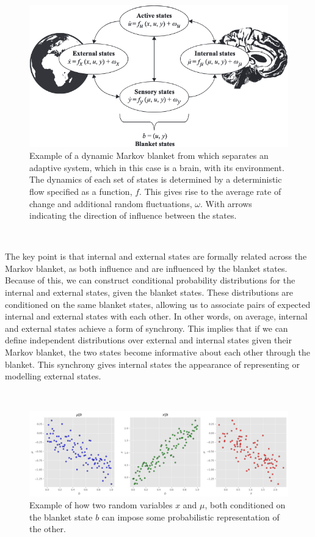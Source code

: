 \documentclass{article}
\begin{document}
\begin{figure}[htbp]
    \centering
    \includegraphics[scale=0.55]{images/markov_blanket.png}
    \caption{Example of a dynamic Markov blanket from \citet{parr2022ActiveInference} which separates an adaptive system, which in this case is a brain, with its environment. The dynamics of each set of states is determined by a deterministic flow specified as a function, $f$. This gives rise to the average rate of change and additional random fluctuations, $\omega$. With arrows indicating the direction of influence between the states.}
    \label{fig:markov_blanket}
\end{figure}

\

The key point is that internal and external states are formally related across the Markov blanket, as both influence and are influenced by the blanket states. Because of this, we can construct conditional probability distributions for the internal and external states, given the blanket states. These distributions are conditioned on the same blanket states, allowing us to associate pairs of expected internal and external states with each other. In other words, on average, internal and external states achieve a form of synchrony. This implies that if we can define independent distributions over external and internal states given their Markov blanket, the two states become informative about each other through the blanket. This synchrony gives internal states the appearance of representing or modelling external states.

\

\begin{figure}[htbp]
    \centering
    \includegraphics[scale=0.4]{images/blanket_prob_relation.png}
    \caption{Example of how two random variables $x$ and $\mu$, both conditioned on the blanket state $b$ can impose some probabilistic representation of the other.}
    \label{fig:markov_blanket_prob_relation}
\end{figure}
\end{document}
